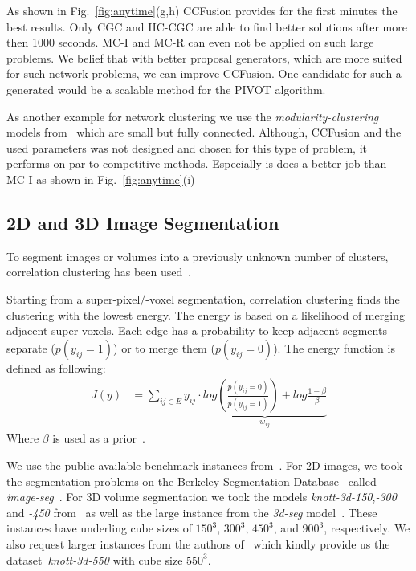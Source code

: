 \documentclass[10pt,twocolumn,letterpaper]{article}
\theoremstyle{definition}
\begin{document}
As shown in Fig.~\ref{fig:anytime}(g,h) CCFusion provides for the first minutes the best results.
Only CGC and HC-CGC are able to find better solutions after more then 1000 seconds.
MC-I and MC-R can even not be applied on such large problems.
We belief that with better proposal generators, which are more suited for such network problems,
we can improve CCFusion. One candidate for such a generated would be a scalable method for the 
PIVOT algorithm.

As another example for network clustering we use the \emph{modularity-clustering} models from~\cite{kappes_2014_benchmark_arxiv} which are small but fully connected.
Although, CCFusion and the used parameters was not designed and chosen for this type of problem, it performs on par to competitive methods. 
Especially is does a better job than MC-I as shown in Fig.~\ref{fig:anytime}(i)



\subsection{2D and 3D Image Segmentation}\label{sec:imseg}
To segment images or volumes into a previously
unknown number of clusters, correlation clustering
has been used~\cite{andres_2011_iccv,kroeger_2012_eccv}.

Starting from a super-pixel/-voxel segmentation,
correlation clustering finds the clustering with the lowest energy.
The energy is based on a likelihood of merging adjacent super-voxels.
Each edge has a probability to keep adjacent segments separate ($p(y_{ij} =1)$)
or to merge them ($p(y_{ij} = 0)$).
The energy function is defined as following:
\begin{align}
 J(y)  &= \sum_{ij \in E} y_{ij}\cdot \underbrace{  log\left( \frac{p(y_{ij} =0)}{p(y_{ij} =1)}\right) + log \frac{1-\beta}{\beta}  }_{w_{ij}}
\end{align}
Where $\beta$ is used as a prior~\cite{andres_2011_iccv}.

We use the public available benchmark instances from~\cite{kappes_2013_benchmark_cvpr,kappes_2014_benchmark_arxiv}.
For 2D images, we took the segmentation problems on the Berkeley Segmentation Database~\cite{martin_2001} called \emph{image-seg}~\cite{andres_2011_iccv,kappes_2013_benchmark_cvpr}.
For 3D volume segmentation we took the models \emph{knott-3d-150},\emph{-300} and \emph{-450} from~\cite{kroeger_2012_eccv,kappes_2014_benchmark_arxiv} as well as the large
instance from the \emph{3d-seg} model~\cite{andres_2011_iccv,kappes_2013_benchmark_cvpr}. These instances have underling cube sizes of  $150^3$, $300^3$, $450^3$, and $900^3$, respectively.
We also request larger instances from the authors of~\cite{kroeger_2012_eccv} which kindly provide us the dataset~\emph{knott-3d-550} with cube size  $550^3$.
\end{document}
